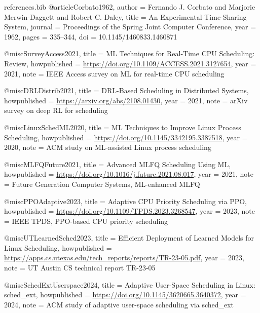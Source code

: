 \begin{filecontents*}{references.bib}
@article{Corbato1962,
  author    = {Fernando J. Corbato and Marjorie Merwin-Daggett and Robert C. Daley},
  title     = {An Experimental Time-Sharing System},
  journal   = {Proceedings of the Spring Joint Computer Conference},
  year      = {1962},
  pages     = {335--344},
  doi       = {10.1145/1460833.1460871}
}


@misc{SurveyAccess2021,
  title = {{ML} Techniques for Real-Time {CPU} Scheduling: Review},
  howpublished = {\url{https://doi.org/10.1109/ACCESS.2021.3127654}},
  year = {2021},
  note = {IEEE Access survey on ML for real-time CPU scheduling}
}

@misc{DRLDistrib2021,
  title = {{DRL}-Based Scheduling in Distributed Systems},
  howpublished = {\url{https://arxiv.org/abs/2108.01430}},
  year = {2021},
  note = {arXiv survey on deep RL for scheduling}
}

@misc{LinuxSchedML2020,
  title = {{ML} Techniques to Improve {Linux} Process Scheduling},
  howpublished = {\url{https://doi.org/10.1145/3342195.3387518}},
  year = {2020},
  note = {ACM study on ML-assisted Linux process scheduling}
}

@misc{MLFQFuture2021,
  title = {Advanced {MLFQ} Scheduling Using {ML}},
  howpublished = {\url{https://doi.org/10.1016/j.future.2021.08.017}},
  year = {2021},
  note = {Future Generation Computer Systems, ML-enhanced MLFQ}
}

@misc{PPOAdaptive2023,
  title = {Adaptive {CPU} Priority Scheduling via {PPO}},
  howpublished = {\url{https://doi.org/10.1109/TPDS.2023.3268547}},
  year = {2023},
  note = {IEEE TPDS, PPO-based CPU priority scheduling}
}

@misc{UTLearnedSched2023,
  title = {Efficient Deployment of Learned Models for {Linux} Scheduling},
  howpublished = {\url{https://apps.cs.utexas.edu/tech_reports/reports/TR-23-05.pdf}},
  year = {2023},
  note = {UT Austin CS technical report TR-23-05}
}

@misc{SchedExtUserspace2024,
  title = {Adaptive User-Space Scheduling in {Linux}: sched\_ext},
  howpublished = {\url{https://doi.org/10.1145/3620665.3640372}},
  year = {2024},
  note = {ACM study of adaptive user-space scheduling via sched\_ext}
}


\end{filecontents*}
